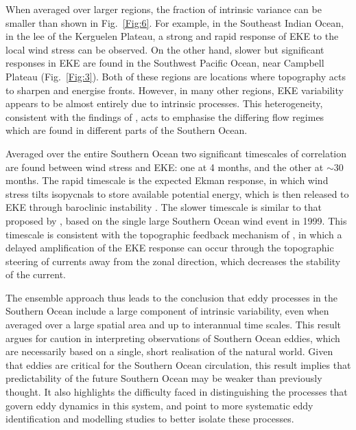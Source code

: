 \documentclass{agujournal2019}
\begin{document}
When averaged over larger regions, the fraction of intrinsic variance can be smaller than shown in Fig.~\ref{Fig:6}.
For example, in the Southeast Indian Ocean, in the lee of the Kerguelen Plateau, a strong and rapid response of EKE to the local wind stress can be observed.
On the other hand, slower but significant responses in EKE are found in the Southwest Pacific Ocean, near Campbell Plateau (Fig.~\ref{Fig:3}).
Both of these regions are locations where topography acts to sharpen and energise fronts.
However, in many other regions, EKE variability appears to be almost entirely due to intrinsic processes.
This heterogeneity, consistent with the findings of \citet{Patara2016}, acts to emphasise the differing flow regimes which are found in different parts of the Southern Ocean.

Averaged over the entire Southern Ocean two significant timescales of correlation are found between wind stress and EKE: one at 4 months, and the other at $\sim$30 months.
The rapid timescale is the expected Ekman response, in which wind stress tilts isopycnals to store available potential energy, which is then released to EKE through baroclinic instability \citep[e.g.][]{Sinha2016}.
The slower timescale is similar to that proposed by \citet{Meredith-Hogg-2006}, based on the single large Southern Ocean wind event in 1999.
This timescale is consistent with the  topographic feedback mechanism of \citet{Hogg-Blundell-2006}, in which a delayed amplification of the EKE response can occur through the topographic steering of currents away from the zonal direction, which decreases the stability of the current.
 
The ensemble approach thus leads to the conclusion that eddy processes in the Southern Ocean include a large component of intrinsic variability, even when averaged over a large spatial area and up to interannual time scales.
This result argues for caution in interpreting observations of Southern Ocean eddies, which are necessarily based on a single, short realisation of the natural world.
Given that eddies are critical for the Southern Ocean circulation, this result implies that predictability of the future Southern Ocean may be weaker than previously thought.
It also highlights the difficulty faced in distinguishing the processes that govern eddy dynamics in this system, and point to more systematic eddy identification and modelling studies to better isolate these processes.
 
\end{document}
